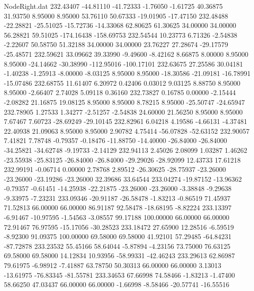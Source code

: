\begin{filecontents}{NodeRight.dat}
 232.43407  -44.81110  -41.72333    -1.76050   -1.61725   40.36875   31.93750    8.95000    8.95000   53.76110   50.67333  -19.01905  -17.47150
 232.48488  -22.28821  -25.51025   -15.72736  -14.33068   62.80625   61.30625   34.00000   34.00000   56.28821   59.51025 -174.16438 -158.69753
 232.54544   10.23773    6.71326    -2.54838   -2.22607   50.58750   51.32188   34.00000   34.00000   23.76227   27.28674  -29.17579  -25.48571
 232.59621   33.09662   39.33990    -9.49600   -8.42162    8.66875    8.00000    8.95000    8.95000  -24.14662  -30.38990 -112.95016 -100.17101
 232.63675   27.25586   30.04181    -1.40238   -1.25913   -8.00000   -8.03125    8.95000    8.95000  -18.30586  -21.09181  -16.78991  -15.07486
 232.68755   11.61407    6.20972     0.42406    0.03012    9.03125    8.88750    8.95000    8.95000   -2.66407    2.74028    5.09118    0.36160
 232.73827    0.16785    0.00000    -2.15444   -2.08282   21.16875   19.08125    8.95000    8.95000    8.78215    8.95000  -25.50747  -24.65947
 232.78905    1.27533    1.34277    -2.51257   -2.54838   24.60000   21.56250    8.95000    8.95000    7.67467    7.60723  -28.69249  -29.10145
 232.82961    6.04218    4.19586    -4.66131   -4.37481   22.40938   21.09063    8.95000    8.95000    2.90782    4.75414  -56.07828  -52.63152
 232.90057    7.41821    7.78748    -0.79357   -0.18476  -11.88750  -14.40000  -26.84000  -26.84000  -34.25821  -34.62748   -9.19733   -2.14129
 232.94113    2.45026    2.08099     1.03287    1.46262  -23.55938  -25.83125  -26.84000  -26.84000  -29.29026  -28.92099   12.43733   17.61218
 232.99191   -0.06714    0.00000     2.78768    2.89512  -26.30625  -28.75937  -23.26000  -23.26000  -23.19286  -23.26000   32.39686   33.64544
 233.04274  -19.87152  -13.96362    -0.79357   -0.61451  -14.25938  -22.21875  -23.26000  -23.26000   -3.38848   -9.29638   -9.33975   -7.23231
 233.09346  -20.91187  -26.58478    -1.83213   -0.86519   71.45937   71.52813   66.00000   66.00000   86.91187   92.58478  -18.68195   -8.82224
 233.13397   -6.91467  -10.97595    -1.54563   -3.08557   99.17188  100.00000   66.00000   66.00000   72.91467   76.97595  -15.17056  -30.28523
 233.18472   27.65900   12.28516    -6.59519   -8.92300   91.09375  100.00000   69.58000   69.58000   41.92101   57.29485  -64.84231  -87.72878
 233.23532   55.45166   58.64044    -5.87894   -4.23156   73.75000   76.63125   69.58000   69.58000   14.12834   10.93956  -58.99331  -42.46243
 233.29613   62.86987   79.61975    -6.98912   -7.41887   63.78750   50.30313   66.00000   66.00000    3.13013  -13.61975  -76.83345  -81.55781
 233.34653   67.66998   74.58466    -1.83213   -1.47400   58.66250   47.03437   66.00000   66.00000   -1.66998   -8.58466  -20.57741  -16.55516

\end{filecontents}

